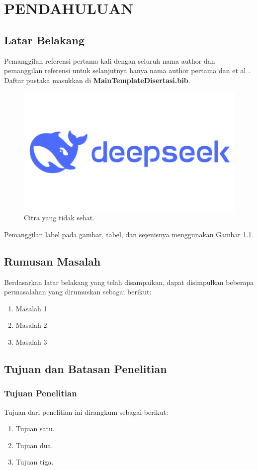 \chapter{PENDAHULUAN}

\section{Latar Belakang}
\label{sec:1-LatarBelakang}

Pemanggilan referensi pertama kali dengan seluruh nama author \citep*{hinton2006fast} dan pemanggilan referensi untuk selanjutnya hanya nama author pertama dan et al \citep{hinton2006fast}. Daftar pustaka masukkan di \textbf{MainTemplateDisertasi.bib}.

\begin{figure}[H]
\centerline{\includegraphics[width=.6\textwidth]{bab1/dir_gambar/DeepSeek-Logo.png}}
\caption{Citra yang tidak sehat.}
\label{cfp_bab1}
\end{figure}

Pemanggilan label pada gambar, tabel, dan sejenisnya menggunakan Gambar \ref{cfp_bab1}. 

\section{Rumusan Masalah}
\label{sec:2-Rumusanmasalah}
Berdasarkan latar belakang yang telah disampaikan, dapat disimpulkan beberapa permasalahan yang dirumuskan sebagai berikut:

\begin{enumerate}
 \item Masalah 1
 \item Masalah 2
 \item Masalah 3
\end{enumerate}

\section{Tujuan dan Batasan Penelitian}
\subsection{Tujuan Penelitian}
\label{sec:3-TujuanPenelitian}
Tujuan dari penelitian ini dirangkum sebagai berikut:
\begin{enumerate}
    \item Tujuan satu.
    \item Tujuan dua.
    \item Tujuan tiga.
\end{enumerate}


